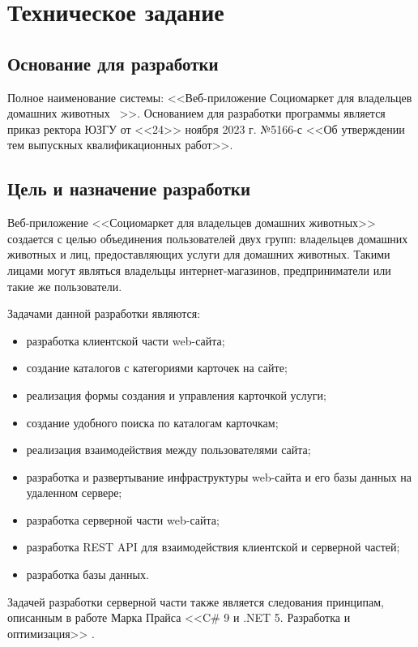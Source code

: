 \section{Техническое задание}
\subsection{Основание для разработки}

Полное наименование системы: <<Веб-приложение \textquotedbl Социомаркет для владельцев домашних животных \textquotedbl\ >>.
Основанием для разработки программы является приказ ректора ЮЗГУ от <<24>> ноября 2023 г. №5166-с <<Об утверждении тем выпускных квалификационных работ>>.

\subsection{Цель и назначение разработки}

Веб-приложение <<Социомаркет для владельцев домашних животных>> создается с целью объединения пользователей двух групп: владельцев домашних животных и лиц, предоставляющих услуги для домашних животных. Такими лицами могут являться владельцы интернет-магазинов, предприниматели или такие же пользователи.

Задачами данной разработки являются:
\begin{itemize}
\item разработка клиентской части web-сайта;
\item создание каталогов с категориями карточек на сайте;
\item реализация формы создания и управления карточкой услуги;
\item создание удобного поиска по каталогам карточкам;
\item реализация взаимодействия между пользователями сайта;
\item разработка и развертывание инфраструктуры web-сайта и его базы данных на удаленном сервере;
\item разработка серверной части web-сайта;
\item разработка REST API для взаимодействия клиентской и серверной частей;
\item разработка базы данных.
\end{itemize}

Задачей разработки серверной части также является следования принципам, описанным в работе Марка Прайса <<C\# 9 и .NET 5. Разработка и оптимизация>> \cite{mark_price}.

